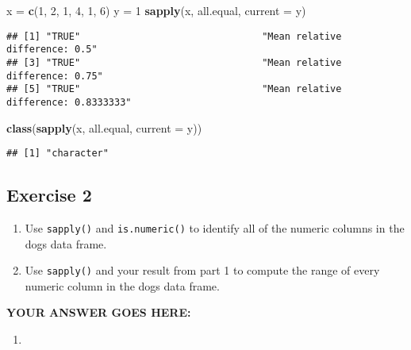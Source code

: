 \documentclass[
]{article}
\newenvironment{Shaded}{\begin{snugshade}}{\end{snugshade}}
\newcommand{\DataTypeTok}[1]{\textcolor[rgb]{0.13,0.29,0.53}{#1}}
\newcommand{\DecValTok}[1]{\textcolor[rgb]{0.00,0.00,0.81}{#1}}
\newcommand{\KeywordTok}[1]{\textcolor[rgb]{0.13,0.29,0.53}{\textbf{#1}}}
\newcommand{\NormalTok}[1]{#1}
\newcommand{\StringTok}[1]{\textcolor[rgb]{0.31,0.60,0.02}{#1}}
\providecommand{\tightlist}{%
  \setlength{\itemsep}{0pt}\setlength{\parskip}{0pt}}
\begin{document}
\begin{Shaded}
\begin{Highlighting}[]
\NormalTok{x =}\StringTok{ }\KeywordTok{c}\NormalTok{(}\DecValTok{1}\NormalTok{, }\DecValTok{2}\NormalTok{, }\DecValTok{1}\NormalTok{, }\DecValTok{4}\NormalTok{, }\DecValTok{1}\NormalTok{, }\DecValTok{6}\NormalTok{)}
\NormalTok{y =}\StringTok{ }\DecValTok{1}
\KeywordTok{sapply}\NormalTok{(x, all.equal, }\DataTypeTok{current =}\NormalTok{ y)}
\end{Highlighting}
\end{Shaded}

\begin{verbatim}
## [1] "TRUE"                                "Mean relative difference: 0.5"      
## [3] "TRUE"                                "Mean relative difference: 0.75"     
## [5] "TRUE"                                "Mean relative difference: 0.8333333"
\end{verbatim}

\begin{Shaded}
\begin{Highlighting}[]
\KeywordTok{class}\NormalTok{(}\KeywordTok{sapply}\NormalTok{(x, all.equal, }\DataTypeTok{current =}\NormalTok{ y))}
\end{Highlighting}
\end{Shaded}

\begin{verbatim}
## [1] "character"
\end{verbatim}

\hypertarget{exercise-2}{%
\subsection{Exercise 2}\label{exercise-2}}

\begin{enumerate}
\def\labelenumi{\arabic{enumi}.}
\item
  Use \texttt{sapply()} and \texttt{is.numeric()} to identify all of the
  numeric columns in the dogs data frame.
\item
  Use \texttt{sapply()} and your result from part 1 to compute the range
  of every numeric column in the dogs data frame.
\end{enumerate}

\textbf{YOUR ANSWER GOES HERE:}

\begin{enumerate}
\def\labelenumi{\arabic{enumi}.}
\tightlist
\item
\end{enumerate}
\end{document}
